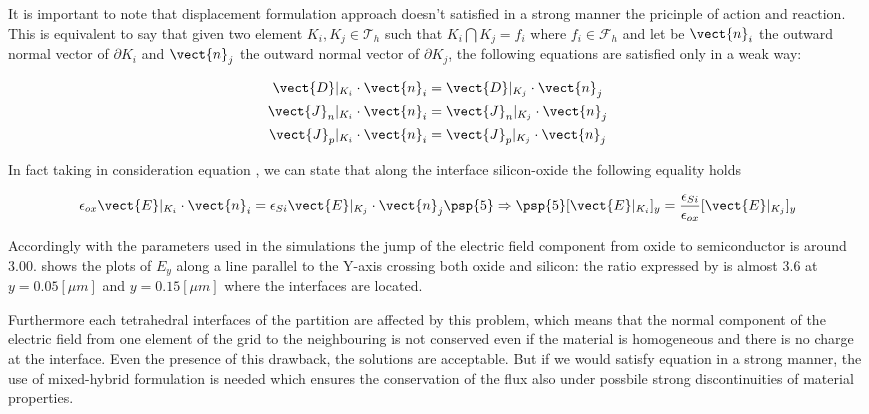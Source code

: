 \vspace{0.5cm}




It is important to note that displacement formulation approach doesn't satisfied  in a strong manner the pricinple of action and reaction.
This is equivalent to say that given two element $K_i,K_j\in \mathcal{T}_h$ such that $K_i \bigcap K_j = f_i$ where $f_i \in \mathcal{F}_h$ and let be  $\vect{n}_{i}$ the outward normal vector of $\partial K_i$ and $\vect{n}_{j}$ the outward normal vector of $\partial K_j$,  the following equations are satisfied only in a weak way:

\begin{align}
\vect{D}|_{K_i}\cdot \vect{n}_{i} & = \vect{D}|_{K_j} \cdot \vect{n}_{j} \label{eq: conservazione vettore spostamento}\\
\vect{J}_n|_{K_i}\cdot \vect{n}_{i} & = \vect{J}_n|_{K_j}\cdot \vect{n}_{j} \\
\vect{J}_p|_{K_i}\cdot \vect{n}_{i} & = \vect{J}_p|_{K_j}\cdot \vect{n}_{j} 
\end{align}


In fact taking in consideration equation , we can state that along the interface silicon-oxide the following equality holds

\begin{equation}
\label{eq: rapporto campi}
\epsilon_{ox}\vect{E}|_{K_i}\cdot \vect{n}_{i} = \epsilon_{Si}\vect{E}|_{K_j} \cdot \vect{n}_{j} \psp{5} \Rightarrow \psp{5}  [\vect{E}|_{K_i}]_y = \dfrac{\epsilon_{Si}}{\epsilon_{ox}}[\vect{E}|_{K_j}]_y
\end{equation}  

Accordingly with the parameters used in the simulations the jump of the electric field component from oxide to semiconductor is around $3.00$.  shows the plots of $E_y$ along a line parallel to the Y-axis crossing both oxide and silicon: the ratio expressed by  is almost $3.6$ at $y=0.05[\mu m]$ and $y = 0.15[\mu m]$ where the interfaces are located.

 Furthermore each tetrahedral interfaces of the partition are affected by this problem, which means that the normal component of the electric field from one element of the grid to the neighbouring is not conserved even if the material is homogeneous and there is no charge at the interface. Even the presence of this drawback, the solutions are acceptable. But if we would satisfy equation  in a strong manner, the use of mixed-hybrid formulation is needed which ensures the conservation of the flux also under possbile strong discontinuities of material properties.


